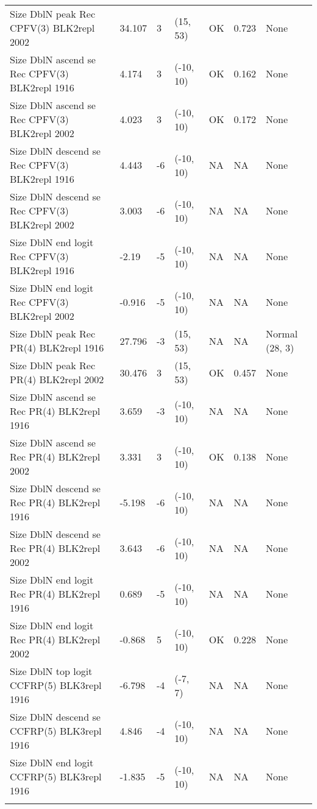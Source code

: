 \documentclass[11pt,
  english,
  letterpaper,
]{article}
\begin{document}
\begin{landscape}
\begin{longtable}[t]{>{\raggedright\arraybackslash}p{7.5cm}lllll>{\raggedright\arraybackslash}p{3.5cm}}
Size DblN peak Rec CPFV(3) BLK2repl 2002 & 34.107 & 3 & (15, 53) & OK & 0.723 & None\\
Size DblN ascend se Rec CPFV(3) BLK2repl 1916 & 4.174 & 3 & (-10, 10) & OK & 0.162 & None\\
Size DblN ascend se Rec CPFV(3) BLK2repl 2002 & 4.023 & 3 & (-10, 10) & OK & 0.172 & None\\
Size DblN descend se Rec CPFV(3) BLK2repl 1916 & 4.443 & -6 & (-10, 10) & NA & NA & None\\
Size DblN descend se Rec CPFV(3) BLK2repl 2002 & 3.003 & -6 & (-10, 10) & NA & NA & None\\
Size DblN end logit Rec CPFV(3) BLK2repl 1916 & -2.19 & -5 & (-10, 10) & NA & NA & None\\
Size DblN end logit Rec CPFV(3) BLK2repl 2002 & -0.916 & -5 & (-10, 10) & NA & NA & None\\
Size DblN peak Rec PR(4) BLK2repl 1916 & 27.796 & -3 & (15, 53) & NA & NA & Normal (28, 3)\\
Size DblN peak Rec PR(4) BLK2repl 2002 & 30.476 & 3 & (15, 53) & OK & 0.457 & None\\
Size DblN ascend se Rec PR(4) BLK2repl 1916 & 3.659 & -3 & (-10, 10) & NA & NA & None\\
Size DblN ascend se Rec PR(4) BLK2repl 2002 & 3.331 & 3 & (-10, 10) & OK & 0.138 & None\\
Size DblN descend se Rec PR(4) BLK2repl 1916 & -5.198 & -6 & (-10, 10) & NA & NA & None\\
Size DblN descend se Rec PR(4) BLK2repl 2002 & 3.643 & -6 & (-10, 10) & NA & NA & None\\
Size DblN end logit Rec PR(4) BLK2repl 1916 & 0.689 & -5 & (-10, 10) & NA & NA & None\\
Size DblN end logit Rec PR(4) BLK2repl 2002 & -0.868 & 5 & (-10, 10) & OK & 0.228 & None\\
Size DblN top logit CCFRP(5) BLK3repl 1916 & -6.798 & -4 & (-7, 7) & NA & NA & None\\
Size DblN descend se CCFRP(5) BLK3repl 1916 & 4.846 & -4 & (-10, 10) & NA & NA & None\\
Size DblN end logit CCFRP(5) BLK3repl 1916 & -1.835 & -5 & (-10, 10) & NA & NA & None\\*
\end{longtable}
\endgroup{}
\end{landscape}
\endgroup{}

\newpage


\end{document}
